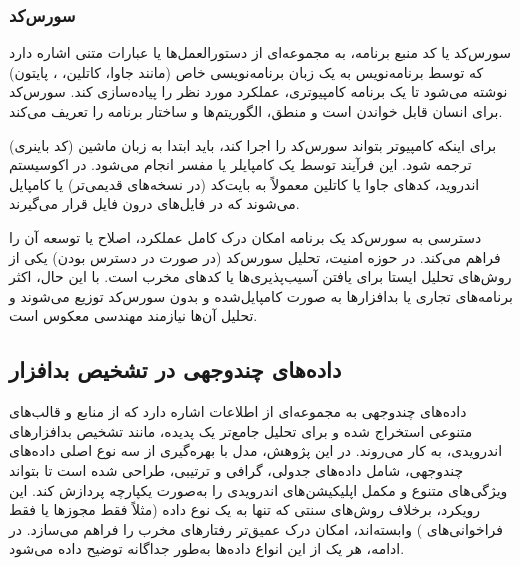 \subsubsection{سورس‌کد}
سورس‌کد  یا کد منبع برنامه، به مجموعه‌ای از دستورالعمل‌ها یا عبارات متنی اشاره دارد که توسط برنامه‌نویس به یک زبان برنامه‌نویسی خاص (مانند جاوا، کاتلین، ، پایتون) نوشته می‌شود تا یک برنامه کامپیوتری، عملکرد مورد نظر را پیاده‌سازی کند. سورس‌کد برای انسان قابل خواندن است و منطق، الگوریتم‌ها و ساختار برنامه را تعریف می‌کند.

برای اینکه کامپیوتر بتواند سورس‌کد را اجرا کند، باید ابتدا به زبان ماشین (کد باینری) ترجمه شود. این فرآیند توسط یک کامپایلر یا مفسر انجام می‌شود. در اکوسیستم اندروید، کدهای جاوا یا کاتلین معمولاً به بایت‌کد  (در نسخه‌های قدیمی‌تر) یا   کامپایل می‌شوند که در فایل‌های  درون فایل  قرار می‌گیرند.

دسترسی به سورس‌کد یک برنامه امکان درک کامل عملکرد، اصلاح یا توسعه آن را فراهم می‌کند. در حوزه امنیت، تحلیل سورس‌کد (در صورت در دسترس بودن) یکی از روش‌های تحلیل ایستا برای یافتن آسیب‌پذیری‌ها یا کدهای مخرب است. با این حال، اکثر برنامه‌های تجاری یا بدافزارها به صورت کامپایل‌شده و بدون سورس‌کد توزیع می‌شوند و تحلیل آن‌ها نیازمند مهندسی معکوس است.

\subsection{داده‌های چندوجهی در تشخیص بدافزار}
داده‌های چندوجهی  به مجموعه‌ای از اطلاعات اشاره دارد که از منابع و قالب‌های متنوعی استخراج شده و برای تحلیل جامع‌تر یک پدیده، مانند تشخیص بدافزارهای اندرویدی، به کار می‌روند. در این پژوهش، مدل  با بهره‌گیری از سه نوع اصلی داده‌های چندوجهی، شامل داده‌های جدولی، گرافی و ترتیبی، طراحی شده است تا بتواند ویژگی‌های متنوع و مکمل اپلیکیشن‌های اندرویدی را به‌صورت یکپارچه پردازش کند. این رویکرد، برخلاف روش‌های سنتی که تنها به یک نوع داده (مثلاً فقط مجوزها یا فقط فراخوانی‌های ) وابسته‌اند، امکان درک عمیق‌تر رفتارهای مخرب را فراهم می‌سازد. در ادامه، هر یک از این انواع داده‌ها به‌طور جداگانه توضیح داده می‌شود.

